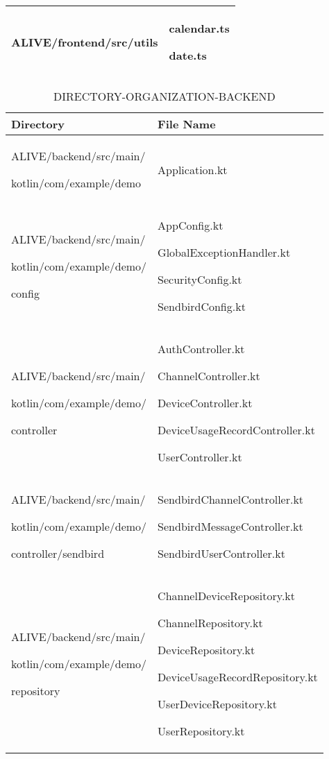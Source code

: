 \documentclass[conference]{IEEEtran}
\begin{document}
\begin{enumerate}
\begin{itemize}
\begin{itemize}
\begin{enumerate}
\begin{table}[h]
\begin{tabular}{|p{3.7cm}|p{4.1cm}|}
          ALIVE/frontend/src/utils \par  & calendar.ts \par date.ts
          \\ \hline
    \end{tabular}
\end{table}

\clearpage

\begin{table}[h!]
\caption{DIRECTORY-ORGANIZATION-BACKEND}
\def\arraystretch{1.24} \small
    \begin{tabular}{|p{3.9cm}|p{4.4cm}|}
        \hline
        Directory & File Name \\ \hline
          ALIVE/backend/src/main/ \par kotlin/com/example/demo & Application.kt  \\ \hline
          
          ALIVE/backend/src/main/ \par kotlin/com/example/demo/ \par config & AppConfig.kt \par GlobalExceptionHandler.kt \par SecurityConfig.kt \par SendbirdConfig.kt\\ \hline
          
          ALIVE/backend/src/main/ \par kotlin/com/example/demo/ \par controller & AuthController.kt \par ChannelController.kt \par DeviceController.kt \par DeviceUsageRecordController.kt \par UserController.kt \\ \hline
          
          ALIVE/backend/src/main/ \par kotlin/com/example/demo/ \par controller/sendbird & SendbirdChannelController.kt \par SendbirdMessageController.kt \par SendbirdUserController.kt \\ \hline
          
          ALIVE/backend/src/main/ \par kotlin/com/example/demo/ \par repository & ChannelDeviceRepository.kt \par ChannelRepository.kt \par DeviceRepository.kt \par DeviceUsageRecordRepository.kt \par UserDeviceRepository.kt \par UserRepository.kt \\ \hline
          

\end{tabular}
\end{table}
\end{enumerate}
\end{itemize}
\end{itemize}
\end{enumerate}
\end{document}
